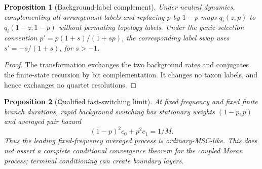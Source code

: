 \documentclass[11pt]{article}
\newtheorem{proposition}{Proposition}
\begin{document}
\begin{proposition}[Background-label complement]
Under neutral dynamics, complementing all arrangement labels and replacing
$p$ by $1-p$ maps $q_i(z;p)$ to $q_i(1-z;1-p)$ without permuting topology
labels. Under the genic-selection convention
$p'=p(1+s)/(1+sp)$, the corresponding label swap uses
$s'=-s/(1+s)$, for $s>-1$.
\end{proposition}

\begin{proof}
The transformation exchanges the two background rates and conjugates the
finite-state recursion by bit complementation. It changes no taxon labels,
and hence exchanges no quartet resolutions.
\end{proof}

\begin{proposition}[Qualified fast-switching limit]
At fixed frequency and fixed finite branch durations, rapid background
switching has stationary weights $(1-p,p)$ and averaged pair hazard
\[
(1-p)^2c_0+p^2c_1=1/M.
\]
Thus the leading fixed-frequency averaged process is ordinary-MSC-like. This
does not assert a complete conditional convergence theorem for the coupled
Moran process; terminal conditioning can create boundary layers.
\end{proposition}
\end{document}
